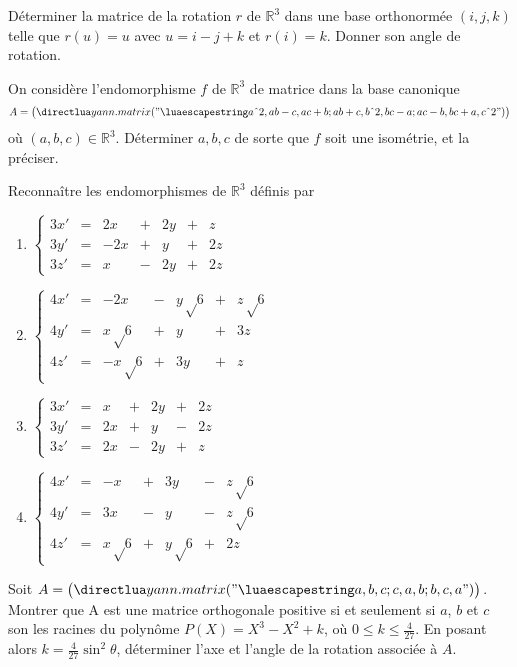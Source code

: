 \documentclass{yann}
\begin{document}
Déterminer la matrice de la rotation $r$ de $ℝ^3$ dans une base orthonormée
$(i, j, k)$ telle que $r(u) = u$
avec $u = i - j + k$ et $r(i) = k$.
Donner son angle de rotation.

\Exercice

On considère l'endomorphisme $f$ de $ℝ^3$ de matrice dans la base canonique
\[ A = \Matrix{a^2,ab-c,ac+b;ab+c,b^2,bc-a;ac-b,bc+a,c^2} \]
où $(a,b,c)∈ℝ^3$.
Déterminer $a,b,c$ de sorte que $f$ soit une isométrie, et la préciser.

\Exercice

Reconnaître les endomorphismes de $ℝ^3$ définis par
\begin{enumerate}
\item $\left\{ \begin{alignedat}{4}
      3x' & {}={} & 2x  & {}+{} & 2y & {}+{} & z  \\
      3y' & {}={} & -2x & {}+{} & y  & {}+{} & 2z \\
      3z' & {}={} & x   & {}-{} & 2y & {}+{} & 2z
  \end{alignedat} \right.$
\item $\left\{ \begin{alignedat}{4}
      4x' & {}={} & -2x      & {}-{} & y√6 & {}+{} & z√6 \\
      4y' & {}={} & x√6  & {}+{} & y       & {}+{} & 3z      \\
      4z' & {}={} & -x√6 & {}+{} & 3y      & {}+{} & z
  \end{alignedat} \right.$
\item $\left\{ \begin{alignedat}{4}
      3x' & {}={} & x  & {}+{} & 2y & {}+{} & 2z \\
      3y' & {}={} & 2x & {}+{} & y  & {}-{} & 2z \\
      3z' & {}={} & 2x & {}-{} & 2y & {}+{} & z
  \end{alignedat} \right.$
\item $\left\{ \begin{alignedat}{4}
      4x' & {}={} & -x      & {}+{} & 3y      & {}-{} & z√6       \\
      4y' & {}={} & 3x      & {}-{} & y       & {}-{} & z√6        \\
      4z' & {}={} & x√6 & {}+{} & y√6 & {}+{} & 2z
  \end{alignedat} \right.$
\end{enumerate}

\Exercice

Soit $\DS A = \Matrix{a,b,c;c,a,b;b,c,a}$.
Montrer que A est une matrice orthogonale positive
si et seulement si $a$, $b$ et $c$ son les racines du polynôme
$P(X) = X^3 - X^2 + k$, où $0≤k≤\frac{4}{27}$.
En posant alors $k = \frac{4}{27} \sin^2θ$, déterminer l'axe
et l'angle de la rotation associée à $A$.
\end{document}
